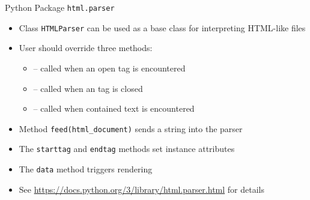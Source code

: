 \begin{frame}[fragile]{Python Package \texttt{html.parser}}
%
\begin{itemize}
\item Class \texttt{HTMLParser} can be used as a base class for interpreting HTML-like files
\item User should override three methods:
	\begin{itemize}
	\item {} -- called when an open tag is encountered
	\item {} -- called when an tag is closed
	\item {} -- called when contained text is encountered
	\end{itemize}
\pause
\item Method \texttt{feed(html\_document)} sends a string into the parser
\pause
\item[\Thus] The \texttt{starttag} and \texttt{endtag} methods set instance attributes
\item[\Thus] The \texttt{data} method triggers rendering
\pause
\item See \url{https://docs.python.org/3/library/html.parser.html} for details
\end{itemize}
%
\end{frame}


